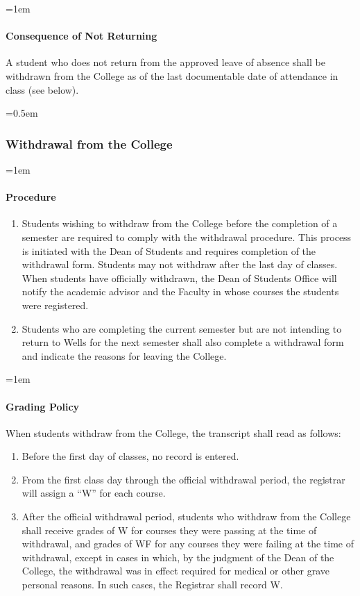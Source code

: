 \documentclass{manual}
\let\oldsubsubsection\subsubsection
\renewcommand\subsubsection{\leftskip=0.5em\oldsubsubsection}
\let\oldparagraph\paragraph
\renewcommand\paragraph{\leftskip=1em\oldparagraph}
\begin{document}
			\paragraph{Consequence of Not Returning}

			A student who does not return from the approved leave of absence shall be withdrawn from the College as of the last documentable date of attendance in class (see below).

		\subsubsection{Withdrawal from the College}\label{sub:WithdrawlFromTheCollege}

			\paragraph{Procedure}

				\begin{enumerate}[label=\alph*)]
				\item Students wishing to withdraw from the College before the completion of a semester are required to comply with the withdrawal procedure. This process is initiated with the Dean of Students and requires completion of the withdrawal form. Students may not withdraw after the last day of classes. When students have officially withdrawn, the Dean of Students Office will notify the academic advisor and the Faculty in whose courses the students were registered.
				\item Students who are completing the current semester but are not intending to return to Wells for the next semester shall also complete a withdrawal form and indicate the reasons for leaving the College.
				\end{enumerate}

			\paragraph{Grading Policy}

			When students withdraw from the College, the transcript shall read as follows:

				\begin{enumerate}[label=\alph*)]
				\item Before the first day of classes, no record is entered.
				\item From the first class day through the official withdrawal period, the registrar will assign a ``W'' for each course.
				\item After the official withdrawal period, students who withdraw from the College shall  receive grades of W for courses they were passing at the time of withdrawal, and grades of WF for any courses they were failing at the time of withdrawal, except in cases in which, by the judgment of the Dean of the College, the withdrawal was in effect required for medical or other grave personal reasons. In such cases, the Registrar shall record W.
				\end{enumerate}
\end{document}
